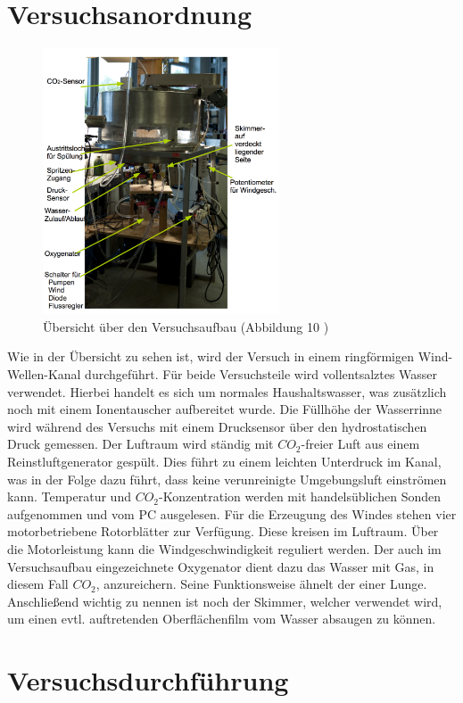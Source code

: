 \documentclass[12pt]{article}
\begin{document}
\section{Versuchsanordnung}

\begin{figure}[H]
	\centering
	\includegraphics[width=70mm]{Versuchsaufbau}
	\caption{Übersicht über den Versuchsaufbau (Abbildung 10 \cite{jaehne})}
\end{figure}

Wie in der Übersicht zu sehen ist, wird der Versuch in einem ringförmigen Wind-Wellen-Kanal durchgeführt. Für beide Versuchsteile wird vollentsalztes Wasser verwendet. Hierbei handelt es sich um normales Haushaltswasser, was zusätzlich noch mit einem Ionentauscher aufbereitet wurde. Die Füllhöhe der Wasserrinne wird während des Versuchs mit einem Drucksensor über den hydrostatischen Druck gemessen. Der Luftraum wird ständig mit $CO_2$-freier Luft aus einem Reinstluftgenerator gespült. Dies führt zu einem leichten Unterdruck im Kanal, was in der Folge dazu führt, dass keine verunreinigte Umgebungsluft einströmen kann. Temperatur und $CO_2$-Konzentration werden mit handelsüblichen Sonden aufgenommen und vom PC ausgelesen. Für die Erzeugung des Windes stehen vier motorbetriebene Rotorblätter zur Verfügung. Diese kreisen im Luftraum. Über die Motorleistung kann die Windgeschwindigkeit reguliert werden. Der auch im Versuchsaufbau eingezeichnete Oxygenator dient dazu das Wasser mit Gas, in diesem Fall $CO_2$, anzureichern. Seine Funktionsweise ähnelt der einer Lunge. Anschließend wichtig zu nennen ist noch der Skimmer, welcher verwendet wird, um einen evtl. auftretenden Oberflächenfilm vom Wasser absaugen zu können.  

\section{Versuchsdurchf\"uhrung}
\end{document}
